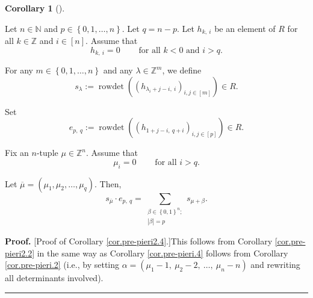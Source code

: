 \documentclass
[numbers=enddot,12pt,final,onecolumn,notitlepage,english]{scrartcl}%
\theoremstyle{definition}
\newtheorem{coro}[theo]{Corollary}
\newenvironment{corollary}[1][]
{\begin{coro}[#1]\begin{leftbar}}
{\end{leftbar}\end{coro}}
\newenvironment{proof}[1][Proof]{\noindent\textbf{#1.} }{\ \rule{0.5em}{0.5em}}
\let\sumnonlimits\sum
\renewcommand{\sum}{\sumnonlimits\limits}
\newenvironment{vershort}{}{}
\begin{document}
\begin{corollary}
\label{cor.pre-pieri2.4}Let $n\in\mathbb{N}$ and $p\in\left\{  0,1,\ldots
,n\right\}  $. Let $q=n-p$. Let $h_{k,\ i}$ be an element of $R$ for all
$k\in\mathbb{Z}$ and $i\in\left[  n\right]  $. Assume that%
\begin{equation}
h_{k,\ i}=0\ \ \ \ \ \ \ \ \ \ \text{for all }k<0\text{ and }i>q.
\end{equation}


For any $m\in\left\{  0,1,\ldots,n\right\}  $ and any $\lambda\in
\mathbb{Z}^{m}$, we define%
\[
s_{\lambda}:=\operatorname*{rowdet}\left(  \left(  h_{\lambda_{i}%
+j-i,\ i}\right)  _{i,j\in\left[  m\right]  }\right)  \in R.
\]


Set%
\[
e_{p,\ q}:=\operatorname*{rowdet}\left(  \left(  h_{1+j-i,\ q+i}\right)
_{i,j\in\left[  p\right]  }\right)  \in R.
\]


Fix an $n$-tuple $\mu\in\mathbb{Z}^{n}$. Assume that%
\begin{equation}
\mu_{i}=0\ \ \ \ \ \ \ \ \ \ \text{for all }i>q.
\label{eq.cor.pre-pieri2.4.mui=0}%
\end{equation}


Let $\overline{\mu}=\left(  \mu_{1},\mu_{2},\ldots,\mu_{q}\right)  $. Then,%
\[
s_{\overline{\mu}}\cdot e_{p,\ q}=\sum_{\substack{\beta\in\left\{
0,1\right\}  ^{n};\\\left\vert \beta\right\vert =p}}s_{\mu+\beta}.
\]

\end{corollary}

\begin{vershort}
\begin{proof}
[Proof of Corollary \ref{cor.pre-pieri2.4}.]This follows from Corollary
\ref{cor.pre-pieri2.2} in the same way as Corollary \ref{cor.pre-pieri.4}
follows from Corollary \ref{cor.pre-pieri.2} (i.e., by setting $\alpha=\left(
\mu_{1}-1,\ \mu_{2}-2,\ \ldots,\ \mu_{n}-n\right)  $ and rewriting all
determinants involved).
\end{proof}
\end{vershort}
\end{document}
